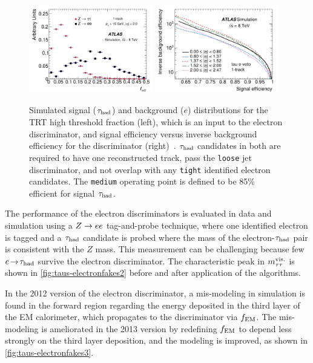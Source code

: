 \begin{figure}[tp]
  \centering
  \includegraphics[width=0.48\textwidth]{figures/PERF-2013-06/fig_08a}
  \includegraphics[width=0.48\textwidth]{figures/PERF-2013-06/fig_09}
  \caption{Simulated signal ($\tau_\text{had}$) and background ($e$) distributions for the TRT high threshold fraction (left), which is an input to the electron discriminator, and signal efficiency versus inverse background efficiency for the discriminator (right)~\cite{PERF-2013-06}. $\tau_\text{had}$ candidates in both are required to have one reconstructed track, pass the \texttt{loose} jet discriminator, and not overlap with any \texttt{tight} identified electron candidates. The \texttt{medium} operating point is defined to be 85\% efficient for signal $\tau_\text{had}$.}
  \label{fig:taus-electronfakes1}
\end{figure}

The performance of the electron discriminators is evaluated in data and simulation using a $Z \rightarrow ee$ tag-and-probe technique, where one identified electron is tagged and a $\tau_\text{had}$ candidate is probed where the mass of the electron-$\tau_\text{had}$ pair is consistent with the $Z$ mass. This measurement can be challenging because few $e \!\rightarrow\!\tau_\text{had}$ survive the electron discriminator. The characteristic peak in $m_{\tau\tau}^\text{vis.}$ is shown in \cref{fig:taus-electronfakes2} before and after application of the algorithms.

In the 2012 version of the electron discriminator, a mis-modeling in simulation is found in the forward region regarding the energy deposited in the third layer of the EM calorimeter, which propagates to the discriminator via $f_\mathrm{EM}$. The mis-modeling is ameliorated in the 2013 version by redefining $f_\mathrm{EM}$ to depend less strongly on the third layer deposition, and the modeling is improved, as shown in \cref{fig:taus-electronfakes3}.

